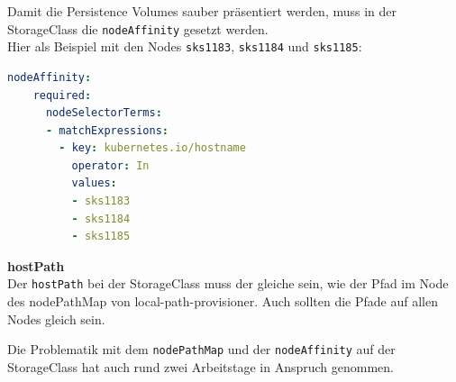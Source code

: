 \begin{flushleft}
    Damit die Persistence Volumes sauber präsentiert werden, muss in der StorageClass die \texttt{nodeAffinity} gesetzt werden.\\
    Hier als Beispiel mit den Nodes \texttt{sks1183}, \texttt{sks1184} und \texttt{sks1185}:
\lstset{style=gra_codestyle}
\begin{lstlisting}[language=yaml, caption=yugabyteDB - StorageClass nodeAffinity,captionpos=b,label={lst:yugabytedb-storageclass_example},breaklines=true]
  nodeAffinity:
    required:
      nodeSelectorTerms:
      - matchExpressions:
        - key: kubernetes.io/hostname
          operator: In
          values:
          - sks1183
          - sks1184
          - sks1185
\end{lstlisting}
    \begin{warning}
        \textbf{hostPath}\\
        Der \texttt{hostPath} bei der StorageClass muss der gleiche sein, wie der Pfad im Node des nodePathMap von \gls{local-path-provisioner}.
        Auch sollten die Pfade auf allen Nodes gleich sein.
    \end{warning}
\end{flushleft}
\begin{flushleft}
    Die Problematik mit dem \texttt{nodePathMap} und der \texttt{nodeAffinity} auf der StorageClass hat auch rund zwei Arbeitstage in Anspruch genommen.
\end{flushleft}